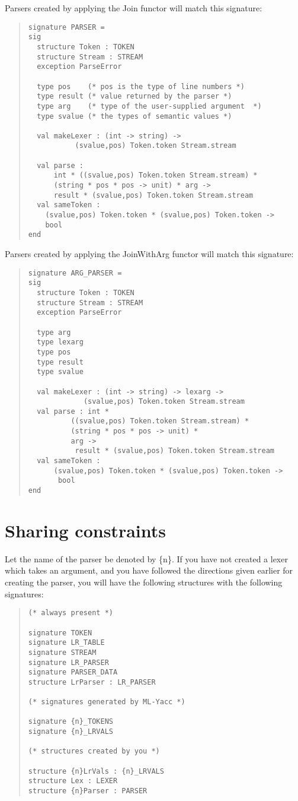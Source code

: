 Parsers created by applying the Join functor will match this signature:
\begin{quote}
\begin{verbatim}
signature PARSER =
sig
  structure Token : TOKEN
  structure Stream : STREAM
  exception ParseError

  type pos    (* pos is the type of line numbers *)
  type result (* value returned by the parser *)
  type arg    (* type of the user-supplied argument  *)
  type svalue (* the types of semantic values *)

  val makeLexer : (int -> string) ->
		   (svalue,pos) Token.token Stream.stream

  val parse :
      int * ((svalue,pos) Token.token Stream.stream) *
      (string * pos * pos -> unit) * arg ->
	  result * (svalue,pos) Token.token Stream.stream
  val sameToken :
    (svalue,pos) Token.token * (svalue,pos) Token.token ->
	bool
end
\end{verbatim}
\end{quote}
Parsers created by applying the JoinWithArg functor will match this
signature:
\begin{quote}
\begin{verbatim}
signature ARG_PARSER = 
sig
  structure Token : TOKEN
  structure Stream : STREAM
  exception ParseError

  type arg
  type lexarg
  type pos
  type result
  type svalue

  val makeLexer : (int -> string) -> lexarg ->
		     (svalue,pos) Token.token Stream.stream
  val parse : int *
	      ((svalue,pos) Token.token Stream.stream) *
	      (string * pos * pos -> unit) *
	      arg ->
	       result * (svalue,pos) Token.token Stream.stream
  val sameToken :
      (svalue,pos) Token.token * (svalue,pos) Token.token ->
	   bool
end
\end{verbatim}
\end{quote}

\section{Sharing constraints}

Let the name of the parser be denoted by \{n\}.  If
you have not created a lexer which takes an argument, and
you have followed the directions given earlier for creating the parser, you
will have the following structures with the following signatures:
\begin{quote}
\begin{verbatim}
(* always present *)

signature TOKEN
signature LR_TABLE
signature STREAM
signature LR_PARSER
signature PARSER_DATA
structure LrParser : LR_PARSER

(* signatures generated by ML-Yacc *)

signature {n}_TOKENS
signature {n}_LRVALS

(* structures created by you *)

structure {n}LrVals : {n}_LRVALS
structure Lex : LEXER
structure {n}Parser : PARSER
\end{verbatim}
\end{quote}

